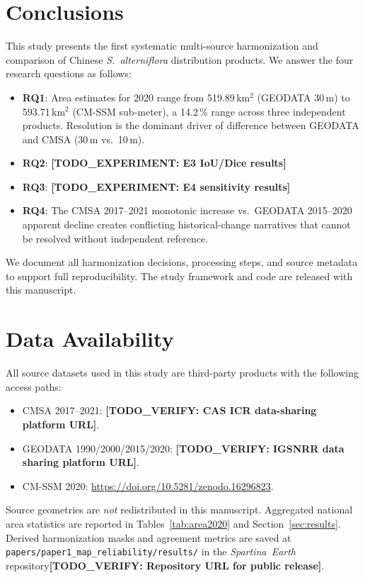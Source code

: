 \documentclass[11pt]{article}
\newcommand{\TODOEXP}[1]{\textcolor{todocolor}{\textbf{[TODO_EXPERIMENT: #1]}}}
\newcommand{\TODOVERIFY}[1]{\textcolor{todocolor}{\textbf{[TODO_VERIFY: #1]}}}
\begin{document}
\section{Conclusions}
\label{sec:conclusions}

This study presents the first systematic multi-source harmonization and
comparison of Chinese \textit{S.~alterniflora} distribution products. We
answer the four research questions as follows:

\begin{itemize}[nosep]
\item \textbf{RQ1}: Area estimates for 2020 range from 519.89\,km$^2$ (GEODATA
  30\,m) to 593.71\,km$^2$ (CM-SSM sub-meter), a 14.2\,\% range across three
  independent products. Resolution is the dominant driver of difference
  between GEODATA and CMSA (30\,m vs.\ 10\,m).
\item \textbf{RQ2}: \TODOEXP{E3 IoU/Dice results}
\item \textbf{RQ3}: \TODOEXP{E4 sensitivity results}
\item \textbf{RQ4}: The CMSA 2017--2021 monotonic increase vs.\ GEODATA 2015--2020
  apparent decline creates conflicting historical-change narratives that
  cannot be resolved without independent reference.
\end{itemize}

We document all harmonization decisions, processing steps, and source metadata
to support full reproducibility. The study framework and code are released with
this manuscript.

\section*{Data Availability}
\label{sec:data-availability}

All source datasets used in this study are third-party products with the
following access paths:
\begin{itemize}[nosep]
\item CMSA 2017--2021: \TODOVERIFY{CAS ICR data-sharing platform URL}.
\item GEODATA 1990/2000/2015/2020: \TODOVERIFY{IGSNRR data sharing platform URL}.
\item CM-SSM 2020: \url{https://doi.org/10.5281/zenodo.16296823}.
\end{itemize}
Source geometries are \emph{not} redistributed in this manuscript. Aggregated
national area statistics are reported in Tables~\ref{tab:area2020} and
Section~\ref{sec:results}. Derived harmonization masks and agreement metrics
are saved at \texttt{papers/paper1\_map\_reliability/results/} in the
\textit{Spartina~Earth} repository\TODOVERIFY{Repository URL for public release}.
\end{document}
